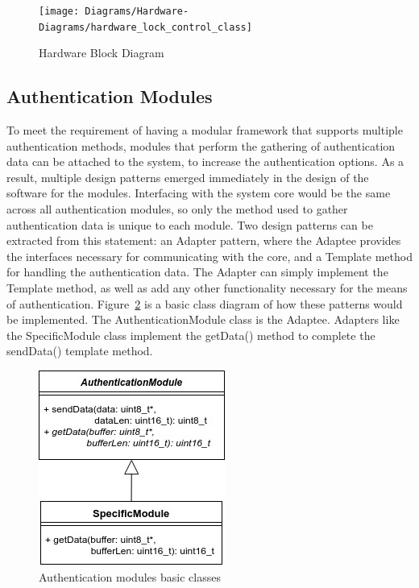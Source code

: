 \documentclass[12pt]{report}
\let\Oldsubsection\subsection
\renewcommand{\subsection}{\FloatBarrier\Oldsubsection}
\begin{document}
\begin{figure}
    \texttt{[image: Diagrams/Hardware-Diagrams/hardware\_lock\_control\_class]}
    \caption{Hardware Block Diagram}
    \label{fig:hardware-lock-control-class}
\end{figure}


\subsection{Authentication Modules} \label{authentication-modules}

To meet the requirement of having a modular framework that supports multiple authentication methods, modules that 
perform the gathering of authentication data can be attached to the system, to increase the authentication options. As 
a result, multiple design patterns emerged immediately in the design of the software for the modules. Interfacing with 
the system core would be the same across all authentication modules, so only the method used to gather authentication 
data is unique to each module. Two design patterns can be extracted from this statement: an Adapter pattern, where the 
Adaptee provides the interfaces necessary for communicating with the core, and a Template method for handling the 
authentication data. The Adapter can simply implement the Template method, as well as add any other functionality 
necessary for the means of authentication. Figure~\ref{fig:modules-start} is a basic class diagram of how these 
patterns would be implemented. The AuthenticationModule class is the Adaptee. Adapters like the SpecificModule class 
implement the getData() method to complete the sendData() template method.

\begin{figure}
    \centering
    \includegraphics{Diagrams/Hardware-Diagrams/modules_start}
    \caption{Authentication modules basic classes}
    \label{fig:modules-start}
\end{figure}
\end{document}
